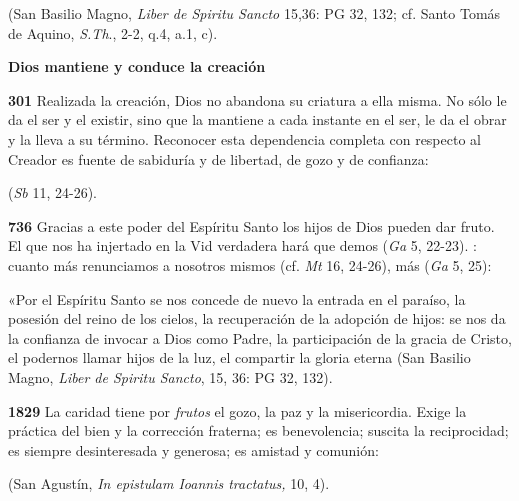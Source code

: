 \begin{body}
\begin{body}
 (San Basilio Magno, \emph{Liber de Spiritu Sancto} 15,36: PG 32, 132; cf. Santo Tomás de Aquino, \emph{S.Th}., 2-2, q.4, a.1, c).

\textbf{Dios mantiene y conduce la creación}

\textbf{301} Realizada la creación, Dios no abandona su criatura a ella misma. No sólo le da el ser y el existir, sino que la mantiene a cada instante en el ser, le da el obrar y la lleva a su término. Reconocer esta dependencia completa con respecto al Creador es fuente de sabiduría y de libertad, de gozo y de confianza:

 (\emph{Sb} 11, 24-26).

\textbf{736} Gracias a este poder del Espíritu Santo los hijos de Dios pueden dar fruto. El que nos ha injertado en la Vid verdadera hará que demos  (\emph{Ga} 5, 22-23). : cuanto más renunciamos a nosotros mismos (cf. \emph{Mt} 16, 24-26), más  (\emph{Ga} 5, 25):

«Por el Espíritu Santo se nos concede de nuevo la entrada en el paraíso, la posesión del reino de los cielos, la recuperación de la adopción de hijos: se nos da la confianza de invocar a Dios como Padre, la participación de la gracia de Cristo, el podernos llamar hijos de la luz, el compartir la gloria eterna (San Basilio Magno, \emph{Liber de Spiritu Sancto}, 15, 36: PG 32, 132).

\textbf{1829} La caridad tiene por \emph{frutos} el gozo, la paz y la misericordia. Exige la práctica del bien y la corrección fraterna; es benevolencia; suscita la reciprocidad; es siempre desinteresada y generosa; es amistad y comunión:

 (San Agustín, \emph{In epistulam Ioannis tractatus,} 10, 4).


\end{body}
\end{body}
